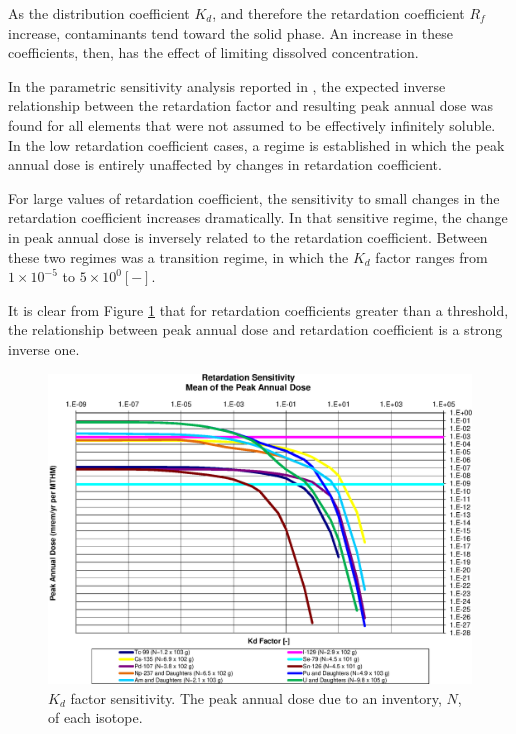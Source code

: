 

As the distribution coefficient $K_d$, and therefore the retardation
coefficient $R_f$ increase, contaminants tend toward the solid phase. An
increase in these coefficients, then, has the effect of limiting dissolved
concentration.

In the parametric sensitivity analysis reported in \cite{huff_key_2012},
the expected inverse relationship between the retardation factor and resulting
peak annual dose was found for all elements that were not assumed to be
effectively infinitely soluble.  In the low retardation coefficient cases, a
regime is established in which the peak annual dose is entirely unaffected by
changes in retardation coefficient.

For large values of retardation coefficient, the sensitivity to small changes
in the retardation coefficient increases dramatically. In that sensitive
regime, the change in peak annual dose is inversely related to the retardation
coefficient. Between these two regimes was a transition regime, in which the
$K_d$ factor ranges from $1\times10^{-5}$ to $5\times10^{0} [-]$.

It is clear from Figure \ref{fig:KdSumFactor} that
for retardation coefficients greater than a threshold, the
relationship between peak annual dose and retardation coefficient is a strong
inverse one.

\begin{figure}[ht]
\centering
\includegraphics[width=0.7\linewidth]{./results/images/Retardation_Summary_kdFactor.eps}
\caption[$K_d$ factor sensitivity]{$K_d$ factor sensitivity.
The peak annual dose due to an inventory,
$N$, of each isotope.}
\label{fig:KdSumFactor}
\end{figure}

\FloatBarrier
